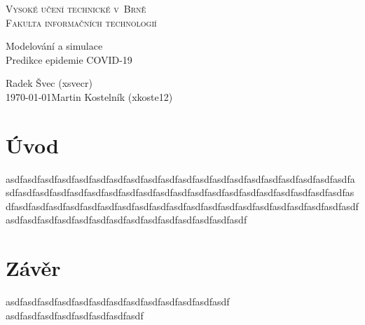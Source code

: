 \documentclass[a4paper,11pt]{article}
\begin{document}
	\begin{titlepage}
		\begin{center}
			\textsc{\Huge Vysoké učení technické v~Brně\\
				\vspace{0.4em}\huge Fakulta informačních technologií}
			
			
			{\LARGE Modelování a simulace\\
				\Huge Predikce epidemie COVID-19\\ \vspace{0.3em}}
			
			
			{\Large \hfill Radek Švec (xsvecr)\\ \today \hfill Martin Kostelník (xkoste12)}
		\end{center}
	\end{titlepage}

	\section{Úvod}
		asdfasdfasdfasdfasdfasdfasdfasdfasdfasdfasdfasdfasdfasdfasdfasdfasdfasdfasdfasdfasdfasdfasdfasdfasdfasdfasdfasdfasdfasdfasdfasdfasdfasdfasdfasdfasdfasdfasdfasdfasdfasdfasdfasdfasdfasdfasdfasdfasdfasdfasdfasdfasdfasdfasdfasdfasdfasdfasdfasdfasdfasdfasdfasdfasdfasdfasdfasdfasdfasdfasdfasdfasdfasdfasdf
			
	\section{Závěr}
		asdfasdfasdfasdfasdfasdfasdfasdfasdfasdfasdfasdfasdf
		asdfasdfasdfasdfasdfasdfasdfasdf

	\newpage
	
	\renewcommand{\refname}{Literatura}
	
\end{document}

